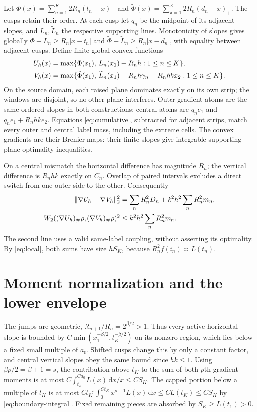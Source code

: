 \documentclass[11pt]{article}
\theoremstyle{remark}\newtheorem{remark}[theorem]{Remark}
\newcommand{\dd}{\,\mathrm d}
\newcommand{\norm}[1]{\lVert#1\rVert}
\begin{document}
Let $\Phi(x)=\sum_{n=1}^K2R_n(t_n-x)_+$ and
$\widetilde\Phi(x)=\sum_{n=1}^K2R_n(d_n-x)_+$. The cusps retain their order. At each cusp let $q_n$ be the midpoint of its adjacent slopes, and $L_n,\widetilde L_n$ the respective supporting lines. Monotonicity of slopes gives globally
$\Phi-L_n\ge R_n|x-t_n|$ and
$\widetilde\Phi-\widetilde L_n\ge R_n|x-d_n|$,
with equality between adjacent cusps. Define finite global convex functions
\begin{align}
 U_h(x)&=\max\{\Phi(x_1),\,L_n(x_1)+R_nh:1\le n\le K\},\notag\\
 V_h(x)&=\max\{\widetilde\Phi(x_1),\,
       \widetilde L_n(x_1)+R_nh\gamma_n+R_nhkx_2:1\le n\le K\}.
 \label{eq:potentials}
\end{align}
On the source domain, each raised plane dominates exactly on its own strip; the windows are disjoint, so no other plane interferes. Outer gradient atoms are the same ordered slopes in both constructions; central atoms are $q_ne_1$ and $q_ne_1+R_nhk e_2$. Equations \eqref{eq:cumulative}, subtracted for adjacent strips, match every outer and central label mass, including the extreme cells. The convex gradients are their Brenier maps: their finite slopes give integrable supporting-plane optimality inequalities.

On a central mismatch the horizontal difference has magnitude $R_n$; the vertical difference is $R_nhk$ exactly on $C_n$. Overlap of paired intervals excludes a direct switch from one outer side to the other. Consequently
\begin{align}
 \norm{\nabla U_h-\nabla V_h}_2^2
 &=\sum_nR_n^2D_n+k^2h^2\sum_nR_n^2m_n,\notag\\
 W_2((\nabla U_h)_\#\rho,(\nabla V_h)_\#\rho)^2
 &\le k^2h^2\sum_nR_n^2m_n. \label{eq:costs}
\end{align}
The second line uses a valid same-label coupling, without asserting its optimality. By \eqref{eq:local}, both sums have size $hS_K$, because $R_n^2f(t_n)\asymp L(t_n)$.

\section{Moment normalization and the lower envelope}
The jumps are geometric, $R_{n+1}/R_n=2^{\beta/2}>1$. Thus every active horizontal slope is bounded by
$C\min(x_1^{-\beta/2},t_K^{-\beta/2})$ on its nonzero region, which lies below a fixed small multiple of $a_0$. Shifted cusps change this by only a constant factor, and central vertical slopes obey the same bound since $hk\le1$. Using $\beta p/2=\beta+1=s$, the contribution above $t_K$ to the sum of both $p$th gradient moments is at most
$C\int_{t_K}^{Ca_0}L(x)\dd x/x\le CS_K$. The capped portion below a multiple of $t_K$ is at most
$Ct_K^{-s}\int_0^{Ct_K}x^{s-1}L(x)\dd x\le CL(t_K)\le CS_K$
by \eqref{eq:boundary-integral}. Fixed remaining pieces are absorbed by $S_K\ge L(t_1)>0$.
\end{document}
